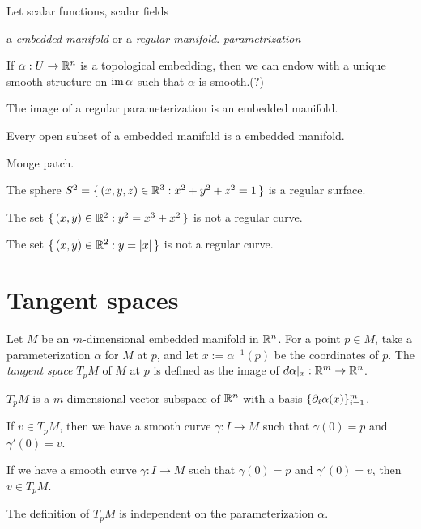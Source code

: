 \documentclass{../note}
\def\a{\alpha}
\begin{document}
\begin{prb}
\end{prb}

\begin{prb}
Let
scalar functions, scalar fields
\end{prb}

\begin{prb}
a \emph{embedded manifold} or a \emph{regular manifold}.
\emph{parametrization}

If $\a:U\to\R^n$ is a topological embedding, then we can endow with a unique smooth structure on $\im\a$ such that $\a$ is smooth.(?)
\begin{parts}
\item The image of a regular parameterization is an embedded manifold.
\item Every open subset of a embedded manifold is a embedded manifold.
\item Monge patch.
\item The sphere $S^2=\{\,(x,y,z)\in\mathbb{R}^3:x^2+y^2+z^2=1\,\}$ is a regular surface.
\item The set $\{\,(x,y)\in\mathbb{R}^2:y^2=x^3+x^2\,\}$ is not a regular curve.
\item The set $\{\,(x,y)\in\mathbb{R}^2:y=|x|\,\}$ is not a regular curve.
\end{parts}
\end{prb}






\section{Tangent spaces}


\begin{prb}
Let $M$ be an $m$-dimensional embedded manifold in $\mathbb{R}^n$.
For a point $p\in M$, take a parameterization $\a$ for $M$ at $p$, and let $x:=\a^{-1}(p)$ be the coordinates of $p$.
The \emph{tangent space} $T_pM$ of $M$ at $p$ is defined as the image of $d\a|_x:\R^m\to\R^n$.
\begin{parts}
\item $T_pM$ is a $m$-dimensional vector subspace of $\mathbb{R}^n$ with a basis $\{\pd_i\alpha(x)\}_{i=1}^m$.
\item If $v\in T_pM$, then we have a smooth curve $\gamma:I\to M$ such that $\gamma(0)=p$ and $\gamma'(0)=v$.
\item If we have a smooth curve $\gamma:I\to M$ such that $\gamma(0)=p$ and $\gamma'(0)=v$, then $v\in T_pM$.
\item The definition of $T_pM$ is independent on the parameterization $\a$.
\end{parts}
\end{prb}
\end{document}
